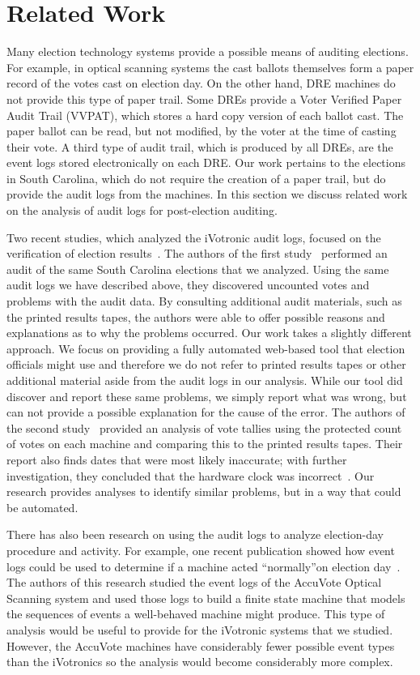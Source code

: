 \documentclass[letterpaper,twocolumn,10pt]{article}
\begin{document}
\section{Related Work}
Many election technology systems provide a possible means of auditing elections. For example, in optical scanning systems the cast ballots themselves form a paper record of the votes cast on election day. On the other hand, DRE machines do not provide this type of paper trail. Some DREs provide a Voter Verified Paper Audit Trail (VVPAT), which stores a hard copy version of each ballot cast. The paper ballot can be read, but not modified, by the voter at the time of casting their vote. A third type of audit trail, which is produced by all DREs, are the event logs stored electronically on each DRE. Our work pertains to the elections in South Carolina, which do not require the creation of a paper trail, but do provide the audit logs from the machines. In this section we discuss related work on the analysis of audit logs for post-election auditing.

Two recent studies, which analyzed the iVotronic audit logs, focused on the verification of election results~\cite{Buell2011,Sandler2007}. The authors of the first study~\cite{Buell2011} performed an audit of the same South Carolina elections that we analyzed. Using the same audit logs we have described above, they discovered uncounted votes and problems with the audit data. By consulting additional audit materials, such as the printed results tapes, the authors were able to offer possible reasons and explanations as to why the problems occurred. Our work takes a slightly different approach. We focus on providing a fully automated web-based tool that election officials might use and therefore we do not refer to printed results tapes or other additional material aside from the audit logs in our analysis. While our tool did discover and report these same problems, we simply report what was wrong, but can not provide a possible explanation for the cause of the error. The authors of the second study~\cite{Sandler2007} provided an analysis of vote tallies using the protected count of votes on each machine and comparing this to the printed results tapes. Their report also finds dates that were most likely inaccurate; with further investigation, they concluded that the hardware clock was incorrect~\cite{Sandler2007}. Our research provides analyses to identify similar problems, but in a way that could be automated.

There has also been research on using the audit logs to analyze election-day procedure and activity. For example, one recent publication showed how event logs could be used to determine if a machine acted \textquotedblleft normally\textquotedblright on election day~\cite{Antonyan2009}. The authors of this research studied the event logs of the AccuVote Optical Scanning system and used those logs to build a finite state machine that models the sequences of events a well-behaved machine might produce. This type of analysis would be useful to provide for the iVotronic systems that we studied. However, the AccuVote machines have considerably fewer possible event types than the iVotronics so the analysis would become considerably more complex.
\end{document}
